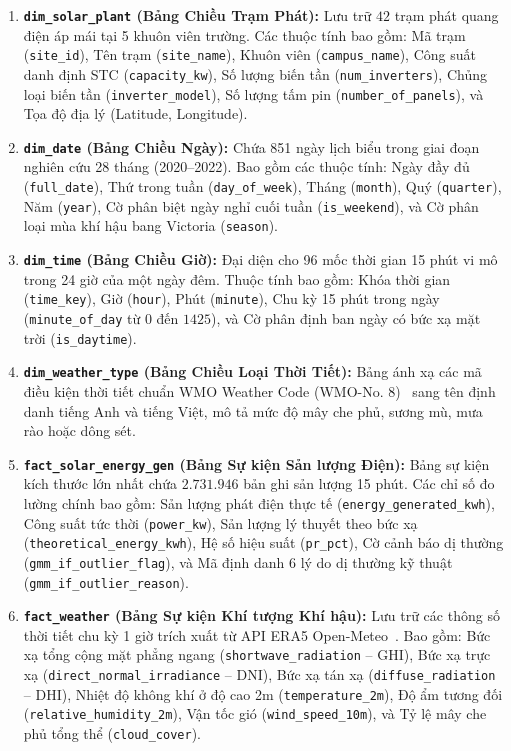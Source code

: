 \documentclass[12pt, a4paper]{report}
\begin{document}
\begin{enumerate}[label=\arabic*., leftmargin=*]
    \item \textbf{\texttt{dim\_solar\_plant} (Bảng Chiều Trạm Phát):} Lưu trữ $42$ trạm phát quang điện áp mái tại 5 khuôn viên trường. Các thuộc tính bao gồm: Mã trạm (\texttt{site\_id}), Tên trạm (\texttt{site\_name}), Khuôn viên (\texttt{campus\_name}), Công suất danh định STC (\texttt{capacity\_kw}), Số lượng biến tần (\texttt{num\_inverters}), Chủng loại biến tần (\texttt{inverter\_model}), Số lượng tấm pin (\texttt{number\_of\_panels}), và Tọa độ địa lý (Latitude, Longitude).
    
    \item \textbf{\texttt{dim\_date} (Bảng Chiều Ngày):} Chứa 851 ngày lịch biểu trong giai đoạn nghiên cứu 28 tháng (2020--2022). Bao gồm các thuộc tính: Ngày đầy đủ (\texttt{full\_date}), Thứ trong tuần (\texttt{day\_of\_week}), Tháng (\texttt{month}), Quý (\texttt{quarter}), Năm (\texttt{year}), Cờ phân biệt ngày nghỉ cuối tuần (\texttt{is\_weekend}), và Cờ phân loại mùa khí hậu bang Victoria (\texttt{season}).
    
    \item \textbf{\texttt{dim\_time} (Bảng Chiều Giờ):} Đại diện cho 96 mốc thời gian 15 phút vi mô trong 24 giờ của một ngày đêm. Thuộc tính bao gồm: Khóa thời gian (\texttt{time\_key}), Giờ (\texttt{hour}), Phút (\texttt{minute}), Chu kỳ 15 phút trong ngày (\texttt{minute\_of\_day} từ $0$ đến $1425$), và Cờ phân định ban ngày có bức xạ mặt trời (\texttt{is\_daytime}).
    
    \item \textbf{\texttt{dim\_weather\_type} (Bảng Chiều Loại Thời Tiết):} Bảng ánh xạ các mã điều kiện thời tiết chuẩn WMO Weather Code (WMO-No. 8)~\cite{wmo2021guide} sang tên định danh tiếng Anh và tiếng Việt, mô tả mức độ mây che phủ, sương mù, mưa rào hoặc dông sét.
    
    \item \textbf{\texttt{fact\_solar\_energy\_gen} (Bảng Sự kiện Sản lượng Điện):} Bảng sự kiện kích thước lớn nhất chứa $2.731.946$ bản ghi sản lượng 15 phút. Các chỉ số đo lường chính bao gồm: Sản lượng phát điện thực tế (\texttt{energy\_generated\_kwh}), Công suất tức thời (\texttt{power\_kw}), Sản lượng lý thuyết theo bức xạ (\texttt{theoretical\_energy\_kwh}), Hệ số hiệu suất (\texttt{pr\_pct}), Cờ cảnh báo dị thường (\texttt{gmm\_if\_outlier\_flag}), và Mã định danh 6 lý do dị thường kỹ thuật (\texttt{gmm\_if\_outlier\_reason}).
    
    \item \textbf{\texttt{fact\_weather} (Bảng Sự kiện Khí tượng Khí hậu):} Lưu trữ các thông số thời tiết chu kỳ 1 giờ trích xuất từ API ERA5 Open-Meteo~\cite{openmeteo2023}. Bao gồm: Bức xạ tổng cộng mặt phẳng ngang (\texttt{shortwave\_radiation} -- GHI), Bức xạ trực xạ (\texttt{direct\_normal\_irradiance} -- DNI), Bức xạ tán xạ (\texttt{diffuse\_radiation} -- DHI), Nhiệt độ không khí ở độ cao 2m (\texttt{temperature\_2m}), Độ ẩm tương đối (\texttt{relative\_humidity\_2m}), Vận tốc gió (\texttt{wind\_speed\_10m}), và Tỷ lệ mây che phủ tổng thể (\texttt{cloud\_cover}).
\end{enumerate}
\end{document}
